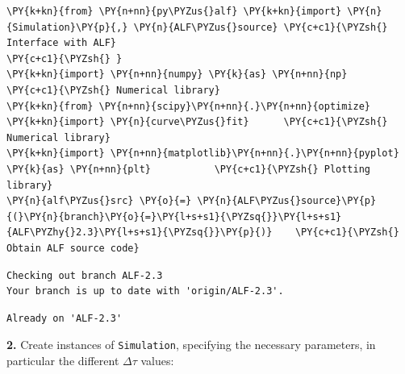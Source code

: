     \begin{tcolorbox}[breakable, size=fbox, boxrule=1pt, pad at break*=1mm,colback=cellbackground, colframe=cellborder]
\begin{Verbatim}[commandchars=\\\{\}]
\PY{k+kn}{from} \PY{n+nn}{py\PYZus{}alf} \PY{k+kn}{import} \PY{n}{Simulation}\PY{p}{,} \PY{n}{ALF\PYZus{}source} \PY{c+c1}{\PYZsh{} Interface with ALF}
\PY{c+c1}{\PYZsh{} }
\PY{k+kn}{import} \PY{n+nn}{numpy} \PY{k}{as} \PY{n+nn}{np}                        \PY{c+c1}{\PYZsh{} Numerical library}
\PY{k+kn}{from} \PY{n+nn}{scipy}\PY{n+nn}{.}\PY{n+nn}{optimize} \PY{k+kn}{import} \PY{n}{curve\PYZus{}fit}      \PY{c+c1}{\PYZsh{} Numerical library}
\PY{k+kn}{import} \PY{n+nn}{matplotlib}\PY{n+nn}{.}\PY{n+nn}{pyplot} \PY{k}{as} \PY{n+nn}{plt}           \PY{c+c1}{\PYZsh{} Plotting library}
\PY{n}{alf\PYZus{}src} \PY{o}{=} \PY{n}{ALF\PYZus{}source}\PY{p}{(}\PY{n}{branch}\PY{o}{=}\PY{l+s+s1}{\PYZsq{}}\PY{l+s+s1}{ALF\PYZhy{}2.3}\PY{l+s+s1}{\PYZsq{}}\PY{p}{)}    \PY{c+c1}{\PYZsh{} Obtain ALF source code}
\end{Verbatim}
\end{tcolorbox}

    \begin{Verbatim}[commandchars=\\\{\}]
Checking out branch ALF-2.3
Your branch is up to date with 'origin/ALF-2.3'.
    \end{Verbatim}

    \begin{Verbatim}[commandchars=\\\{\}]
Already on 'ALF-2.3'
    \end{Verbatim}

    \textbf{2.} Create instances of \texttt{Simulation}, specifying the
necessary parameters, in particular the different \(\Delta \tau\)
values:

